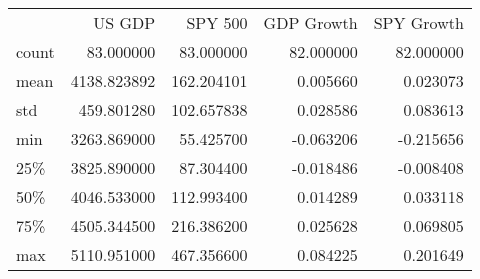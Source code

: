 \begin{tabular}{lrrrr}
 & US GDP & SPY 500 & GDP Growth & SPY Growth \\
count & 83.000000 & 83.000000 & 82.000000 & 82.000000 \\
mean & 4138.823892 & 162.204101 & 0.005660 & 0.023073 \\
std & 459.801280 & 102.657838 & 0.028586 & 0.083613 \\
min & 3263.869000 & 55.425700 & -0.063206 & -0.215656 \\
25\% & 3825.890000 & 87.304400 & -0.018486 & -0.008408 \\
50\% & 4046.533000 & 112.993400 & 0.014289 & 0.033118 \\
75\% & 4505.344500 & 216.386200 & 0.025628 & 0.069805 \\
max & 5110.951000 & 467.356600 & 0.084225 & 0.201649 \\
\end{tabular}
